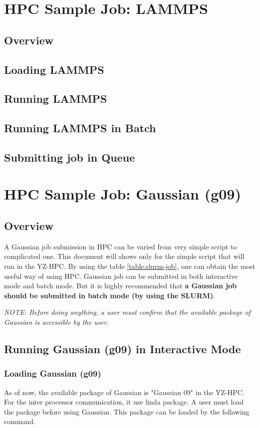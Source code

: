 \documentclass[11pt]{article}
\numberwithin{figure}{section}
\begin{document}
\begin{table}[]
\begin{tabular}{|l|p{3cm}|p{4cm}|p{4.5cm}|}
\end{tabular}
\end{table}

\section{HPC Sample Job: LAMMPS}
\subsection{Overview}
\subsection{Loading LAMMPS}
\subsection{Running LAMMPS}
\subsection{Running LAMMPS in Batch}
\subsection{Submitting job in Queue}


\section{HPC Sample Job: Gaussian (g09)}
\subsection{Overview}
A Gaussian job submission in HPC can be varied from very simple script to
complicated one. This document will shows only for the simple script that will
run in the YZ-HPC. By using the table \ref{table:slurm-job}, one can obtain the
most useful way of using HPC. Gaussian job can be submitted in both interactive
mode and batch mode. But it is highly recommended that \textbf{a Gaussian job should be
submitted in batch mode (by using the SLURM)}.

\textit{NOTE: Before doing anything, a user must confirm that the available package
of Gaussian is accessible by the user.}

\subsection{Running Gaussian (g09) in Interactive Mode}
\subsubsection{Loading Gaussian (g09)}
As of now, the available package of Gaussian is "Gaussian 09" in the YZ-HPC.
For the inter processor communication, it use linda package. A user must load
the package before using Gaussian. This package can be loaded by the following
command.
\end{document}
